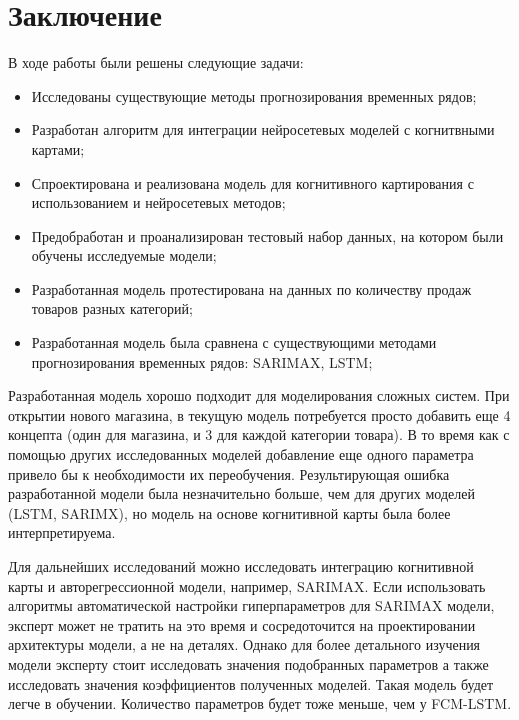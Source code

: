 \chapter*{Заключение}

В ходе работы были решены следующие задачи:

\begin{itemize}
	\item Исследованы существующие методы прогнозирования временных рядов;
	\item Разработан алгоритм для интеграции нейросетевых моделей с когнитвными картами;
	\item Спроектирована и реализована модель для когнитивного картирования с использованием
	и нейросетевых методов;
	\item Предобработан и проанализирован тестовый набор данных, на котором были обучены исследуемые модели;
	\item Разработанная модель протестирована на данных по количеству продаж товаров разных категорий;
	\item Разработанная модель была сравнена с существующими методами
	прогнозирования временных рядов: SARIMAX, LSTM;
\end{itemize}

Разработанная модель хорошо подходит для моделирования сложных систем.
При открытии нового магазина, в текущую модель потребуется просто добавить еще
4 концепта (один для магазина, и 3 для каждой категории товара). В то время
как с помощью других исследованных моделей добавление еще одного параметра
привело бы к необходимости их переобучения.
Результирующая ошибка разработанной модели была незначительно больше,
чем для других моделей (LSTM, SARIMX), но модель на основе когнитивной карты
была более интерпретируема.

Для дальнейших исследований можно исследовать интеграцию когнитивной карты
и авторегрессионной модели, например, SARIMAX. Если использовать алгоритмы
автоматической настройки гиперпараметров для SARIMAX модели, эксперт может не тратить
на это время и сосредоточится на проектировании архитектуры модели, а не на деталях.
Однако для более детального изучения модели эксперту стоит исследовать
значения подобранных параметров а также исследовать значения
коэффициентов полученных моделей. Такая модель будет легче в
обучении. Количество параметров будет тоже меньше, чем у FCM-LSTM.

